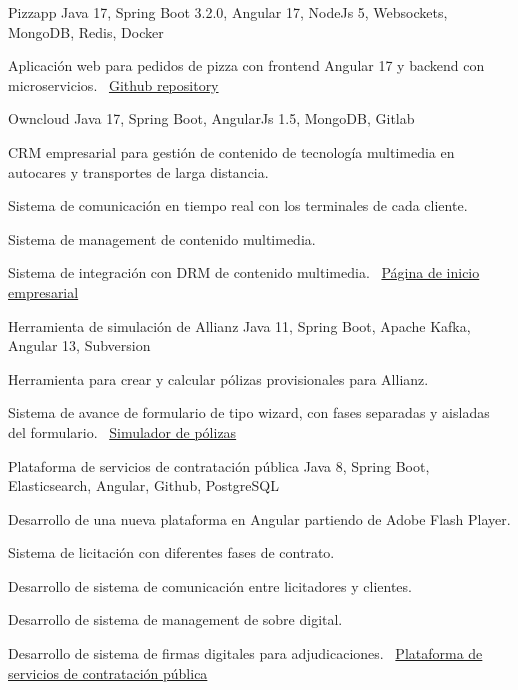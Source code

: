 \documentclass[]{awesome-cv}
\begin{document}
\begin{cventries}
    \cventry
    {}
    {Pizzapp}
    {Java 17, Spring Boot 3.2.0, Angular 17, NodeJs 5, Websockets, MongoDB, Redis, Docker}
    {}
    {\begin{cvitems}
        \item {Aplicación web para pedidos de pizza con frontend Angular 17 y backend con microservicios.
        \newline \faLink\ \href{https://github.com/flautarian/pizzapp}{Github repository}}
    \end{cvitems}}

    \cventry
    {}
    {Owncloud}
    {Java 17, Spring Boot, AngularJs 1.5, MongoDB, Gitlab}
    {}
    {\begin{cvitems}
        \item {CRM empresarial para gestión de contenido de tecnología multimedia en autocares y transportes de larga distancia.}
        \item {Sistema de comunicación en tiempo real con los terminales de cada cliente.}
        \item {Sistema de management de contenido multimedia.}
        \item {Sistema de integración con DRM de contenido multimedia.
        \newline \faLink\ \href{https://www.azimutelectronics.com}{Página de inicio empresarial}}
    \end{cvitems}}

    \cventry
    {}
    {Herramienta de simulación de Allianz}
    {Java 11, Spring Boot, Apache Kafka, Angular 13, Subversion}
    {}
    {\begin{cvitems}
        \item {Herramienta para crear y calcular pólizas provisionales para Allianz.}
        \item {Sistema de avance de formulario de tipo wizard, con fases separadas y aisladas del formulario.
        \newline \faLink\ \href{https://www.allianzdirect.es/seguro-de-coche/calcular-precio/}{Simulador de pólizas}}
    \end{cvitems}}

    \cventry
    {}
    {Plataforma de servicios de contratación pública}
    {Java 8, Spring Boot, Elasticsearch, Angular, Github, PostgreSQL}
    {}
    {\begin{cvitems}
        \item {Desarrollo de una nueva plataforma en Angular partiendo de Adobe Flash Player.}
        \item {Sistema de licitación con diferentes fases de contrato.}
        \item {Desarrollo de sistema de comunicación entre licitadores y clientes.}
        \item {Desarrollo de sistema de management de sobre digital.}
        \item {Desarrollo de sistema de firmas digitales para adjudicaciones.
        \newline \faLink\ \href{https://contractaciopublica.cat/ca/inici}{Plataforma de servicios de contratación pública}}
    \end{cvitems}}


\end{cventries}
\end{document}
